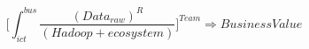 \documentclass{article}
\begin{document}
$$\Bigg[\int_{ict}^{bus} \dfrac{(Data_{raw})^R}{(Hadoop + ecosystem)}\Bigg]^
{Team} \Rightarrow BusinessValue$$
\end{document}
